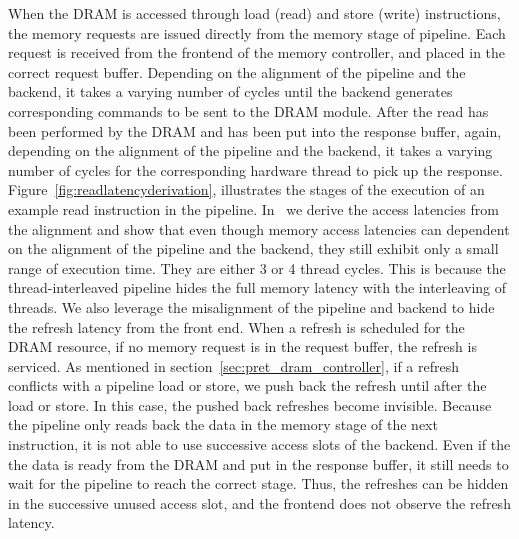 When the DRAM is accessed through load (read) and store (write) instructions, the memory requests are issued directly from the memory stage of pipeline.
Each request is received from the frontend of the memory controller, and placed in the correct request buffer. 
Depending on the alignment of the pipeline and the backend, it takes a varying number of cycles until the backend generates corresponding commands to be sent to the DRAM module.
After the read has been performed by the DRAM and has been put into the response buffer, again, depending on the alignment of the pipeline and the backend, it takes a varying number of cycles for the corresponding hardware thread to pick up the response.
Figure~\ref{fig:readlatencyderivation}, illustrates the stages of the execution of an example read instruction in the pipeline.
In~\cite{ReinekeLiuPatelKimLee11_PRETDRAMControllerBankPrivatizationForPredictability} we derive the access latencies from the alignment and show that even though memory access latencies can dependent on the alignment of the pipeline and the backend, they still exhibit only a small range of execution time.
They are either 3 or 4 thread cycles. 
This is because the thread-interleaved pipeline hides the full memory latency with the interleaving of threads.   
We also leverage the misalignment of the pipeline and backend to hide the refresh latency from the front end. 
When a refresh is scheduled for the DRAM resource, if no memory request is in the request buffer, the refresh is serviced.
As mentioned in section~\ref{sec:pret_dram_controller}, if a refresh conflicts with a pipeline load or store, we push back the refresh until after the load or store. 
In this case, the pushed back refreshes become invisible.
Because the pipeline only reads back the data in the memory stage of the next instruction, it is not able to use successive access slots of the backend.
Even if the the data is ready from the DRAM and put in the response buffer, it still needs to wait for the pipeline to reach the correct stage. 
Thus, the refreshes can be hidden in the successive unused access slot, and the frontend does not observe the refresh latency.   


